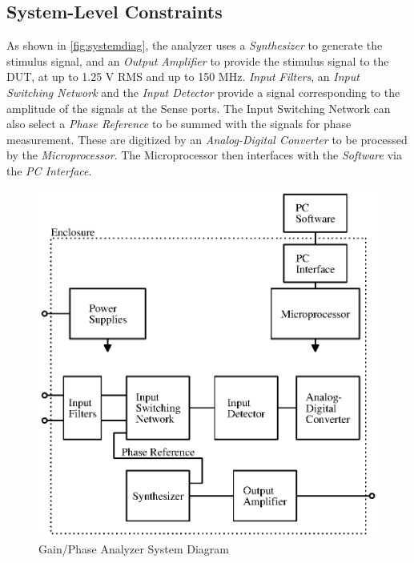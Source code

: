 \subsection{System-Level Constraints}

As shown in \autoref{fig:systemdiag}, the analyzer uses a \emph{Synthesizer} to
generate the stimulus signal, and an \emph{Output Amplifier} to provide the stimulus
signal to the DUT, at up to 1.25 V RMS and up to 150 MHz. \emph{Input Filters}, an
\emph{Input Switching Network} and the \emph{Input Detector} provide a signal corresponding
to the amplitude of the signals at the Sense ports. The Input Switching Network
can also select a \emph{Phase Reference} to be summed with the signals for phase
measurement. These are digitized by an \emph{Analog-Digital Converter} to be processed
by the \emph{Microprocessor}. The Microprocessor then interfaces with the \emph{Software} via
the \emph{PC Interface}.

\begin{figure}[H]
\centering
\includegraphics{systemdiagram}
\caption{Gain/Phase Analyzer System Diagram}
\label{fig:systemdiag}
\end{figure}
